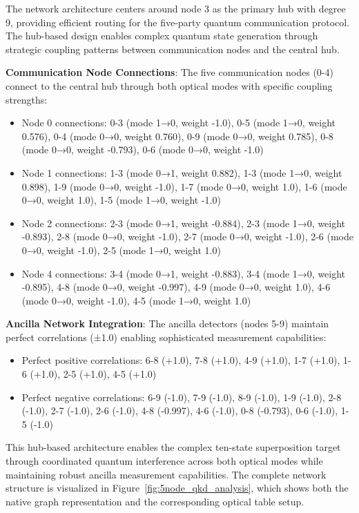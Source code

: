 \documentclass[11pt,a4paper]{article}
\begin{document}
The network architecture centers around node 3 as the primary hub with degree 9, providing efficient routing for the five-party quantum communication protocol. The hub-based design enables complex quantum state generation through strategic coupling patterns between communication nodes and the central hub.

\textbf{Communication Node Connections}: The five communication nodes (0-4) connect to the central hub through both optical modes with specific coupling strengths:
\begin{itemize}
\item Node 0 connections: 0-3 (mode 1→0, weight -1.0), 0-5 (mode 1→0, weight 0.576), 0-4 (mode 0→0, weight 0.760), 0-9 (mode 0→0, weight 0.785), 0-8 (mode 0→0, weight -0.793), 0-6 (mode 0→0, weight -1.0)
\item Node 1 connections: 1-3 (mode 0→1, weight 0.882), 1-3 (mode 1→0, weight 0.898), 1-9 (mode 0→0, weight -1.0), 1-7 (mode 0→0, weight 1.0), 1-6 (mode 0→0, weight 1.0), 1-5 (mode 1→0, weight -1.0)
\item Node 2 connections: 2-3 (mode 0→1, weight -0.884), 2-3 (mode 1→0, weight -0.893), 2-8 (mode 0→0, weight -1.0), 2-7 (mode 0→0, weight -1.0), 2-6 (mode 0→0, weight -1.0), 2-5 (mode 1→0, weight 1.0)
\item Node 4 connections: 3-4 (mode 0→1, weight -0.883), 3-4 (mode 1→0, weight -0.895), 4-8 (mode 0→0, weight -0.997), 4-9 (mode 0→0, weight 1.0), 4-6 (mode 0→0, weight -1.0), 4-5 (mode 1→0, weight 1.0)
\end{itemize}

\textbf{Ancilla Network Integration}: The ancilla detectors (nodes 5-9) maintain perfect correlations (±1.0) enabling sophisticated measurement capabilities:
\begin{itemize}
\item Perfect positive correlations: 6-8 (+1.0), 7-8 (+1.0), 4-9 (+1.0), 1-7 (+1.0), 1-6 (+1.0), 2-5 (+1.0), 4-5 (+1.0)
\item Perfect negative correlations: 6-9 (-1.0), 7-9 (-1.0), 8-9 (-1.0), 1-9 (-1.0), 2-8 (-1.0), 2-7 (-1.0), 2-6 (-1.0), 4-8 (-0.997), 4-6 (-1.0), 0-8 (-0.793), 0-6 (-1.0), 1-5 (-1.0)
\end{itemize}

This hub-based architecture enables the complex ten-state superposition target through coordinated quantum interference across both optical modes while maintaining robust ancilla measurement capabilities. The complete network structure is visualized in Figure~\ref{fig:5node_qkd_analysis}, which shows both the native graph representation and the corresponding optical table setup.
\end{document}
